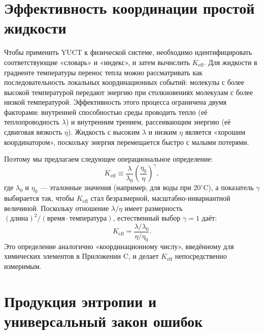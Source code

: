 \documentclass[12pt,a4paper]{article}
\begin{document}
	\section{Эффективность координации простой жидкости}
	
	Чтобы применить YUCT к физической системе, необходимо идентифицировать соответствующие «словарь» и «индекс», и затем вычислить \(K_{\mathrm{eff}}\). Для жидкости в градиенте температуры перенос тепла можно рассматривать как последовательность локальных координационных событий: молекулы с более высокой температурой передают энергию при столкновениях молекулам с более низкой температурой. Эффективность этого процесса ограничена двумя факторами: внутренней способностью среды проводить тепло (её теплопроводность \(\lambda\)) и внутренним трением, рассеивающим энергию (её сдвиговая вязкость \(\eta\)). Жидкость с высоким \(\lambda\) и низким \(\eta\) является «хорошим координатором», поскольку энергия перемещается быстро с малыми потерями.
	
	Поэтому мы предлагаем следующее операциональное определение:
	\begin{equation}\label{eq:Keff-fluid}
		K_{\mathrm{eff}} \equiv \frac{\lambda}{\lambda_0} \left( \frac{\eta_0}{\eta} \right)^{\gamma},
	\end{equation}
	где \(\lambda_0\) и \(\eta_0\) — эталонные значения (например, для воды при \(20^\circ\)C), а показатель \(\gamma\) выбирается так, чтобы \(K_{\mathrm{eff}}\) стал безразмерной, масштабно-инвариантной величиной. Поскольку отношение \(\lambda/\eta\) имеет размерность \((\text{длина})^2/(\text{время}\cdot\text{температура})\), естественный выбор \(\gamma = 1\) даёт:
	\begin{equation}\label{eq:Keff-fluid2}
		K_{\mathrm{eff}} = \frac{\lambda / \lambda_0}{\eta / \eta_0}.
	\end{equation}
	Это определение аналогично «координационному числу», введённому для химических элементов в Приложении C, и делает \(K_{\mathrm{eff}}\) непосредственно измеримым.
	
	\section{Продукция энтропии и универсальный закон ошибок}
	
\end{document}
